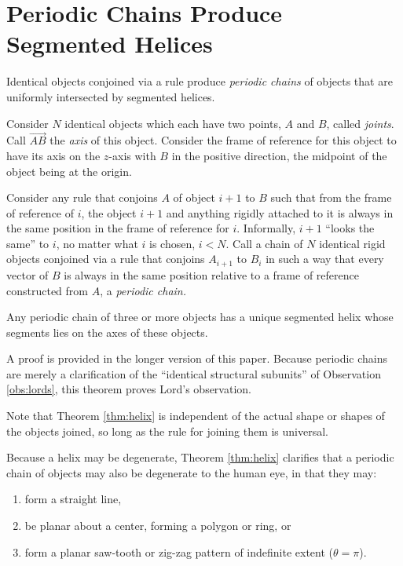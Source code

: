 \documentclass{svproc}
\begin{document}
\label{sec:SegmentedHelix}

\section{Periodic Chains Produce Segmented Helices}

Identical objects conjoined via a rule
produce {\em periodic chains} of objects that are uniformly intersected
by segmented helices.

Consider $N$ identical objects which each have two points, $A$ and $B$, called {\em joints}. Call
$\overrightarrow{AB}$ the {\em axis} of this object.
Consider the frame of reference for this object to have
its axis on the $z$-axis with $B$ in the positive direction, the
midpoint of the object being at the origin.

Consider any rule that conjoins $A$ of object $i+1$ to $B$ such that
from the frame of reference of $i$, the object $i+1$ and anything rigidly
attached to it is always in the same position in the frame of reference for $i$.
Informally, $i+1$ ``looks the same'' to $i$, no matter what $i$ is chosen, $i < N$.
Call a chain of $N$ identical rigid objects conjoined via a rule that
conjoins $A_{i+1}$ to $B_i$ in such a way that every vector
of $B$ is always in the same position relative to a frame of reference
constructed from $A$, a {\em periodic chain.}

\begin{theorem}
  \label{thm:helix}
  Any periodic chain of three or more objects has a unique segmented helix
  whose segments
  lies on the axes of these objects.
\end{theorem}

A proof is provided in the longer version of this paper\cite{readfullsegmentedhelix}.
Because periodic chains are merely a clarification of the ``identical structural subunits''
of Observation \ref{obs:lords},
this theorem proves Lord's observation.

Note that Theorem \ref{thm:helix} is independent of the actual
shape or shapes of the objects joined, so long as the rule for joining them
is universal.

Because a helix may be degenerate, Theorem \ref{thm:helix} clarifies that
a periodic chain of objects may also be degenerate to the human eye, in that they may:
\begin{enumerate}
\item form a straight line,
\item be planar about a center, forming a polygon or ring, or
\item form a planar saw-tooth or zig-zag pattern of indefinite extent ($\theta = \pi$).
\end{enumerate}
\end{document}
